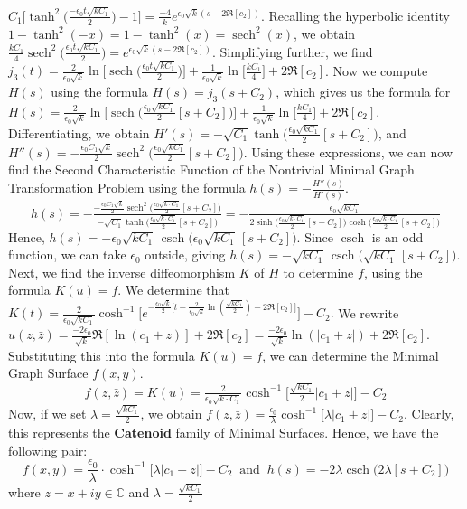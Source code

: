 \documentclass[12pt]{article}
\theoremstyle{plain}
\theoremstyle{definition}
\theoremstyle{remark}
\begin{document}
\(C_1 \big[\tanh^2\big(\tfrac{-\epsilon_0 t \sqrt{k C_1}}{2}\big) - 1\big] = \tfrac{-4}{k} e^{\epsilon_0 \sqrt{k} (s - 2\Re[c_2])}\). Recalling the hyperbolic identity \(1 - \tanh^2(-x) = 1 - \tanh^2(x) = \operatorname{sech}^2(x)\), we obtain  \(\tfrac{k C_1}{4} \operatorname{sech}^2\big(\tfrac{\epsilon_0 t \sqrt{k C_1}}{2}\big) = e^{\epsilon_0 \sqrt{k} (s - 2\Re[c_2])}\). Simplifying further, we find  \(j_3(t) = \tfrac{2}{\epsilon_0 \sqrt{k}} \ln\big[\operatorname{sech}\big(\tfrac{\epsilon_0 t \sqrt{k C_1}}{2}\big)\big] + \tfrac{1}{\epsilon_0 \sqrt{k}} \ln\big[\tfrac{k C_1}{4}\big] + 2\Re[c_2]\). Now we compute \(H(s)\) using the formula \(H(s) = j_3(s + C_2)\), which gives  us the formula for \(H(s) = \tfrac{2}{\epsilon_0 \sqrt{k}} \ln\big[\operatorname{sech}\big(\tfrac{\epsilon_0 \sqrt{k C_1}}{2} [s + C_2]\big)\big] + \tfrac{1}{\epsilon_0 \sqrt{k}} \ln\big[\tfrac{k C_1}{4}\big] + 2\Re[c_2]\). Differentiating, we obtain  \(H'(s) = -\sqrt{C_1} \tanh\big(\tfrac{\epsilon_0 \sqrt{k C_1}}{2} [s + C_2]\big)\), and  \(H''(s) = -\tfrac{\epsilon_0 C_1 \sqrt{k}}{2} \operatorname{sech}^2\big(\tfrac{\epsilon_0 \sqrt{k C_1}}{2} [s + C_2]\big)\). Using these expressions, we can now find the Second Characteristic Function of the Nontrivial Minimal Graph Transformation Problem using the formula \(h(s) = -\tfrac{H''(s)}{H'(s)}\).
\[
  h(s)=-\tfrac{-\tfrac{\epsilon_0C_1\sqrt{k}}{2} \operatorname{sech}^2\big(\tfrac{\epsilon_0\sqrt{k\cdot C_1}}{2}[s+C_2]\big)}{-\sqrt{C_1}\tanh\big(\tfrac{\epsilon_0\sqrt{k\cdot C_1}}{2}[s+C_2]\big)}=-\tfrac{\epsilon_0\sqrt{kC_1}}{2\sinh\big(\tfrac{\epsilon_0\sqrt{k\cdot C_1}}{2}[s+C_2]\big)\cosh\big(\tfrac{\epsilon_0\sqrt{k\cdot C_1}}{2}[s+C_2]\big)}
\]
Hence,  \(h(s) = -\epsilon_0 \sqrt{k C_1}\, \operatorname{csch}\big(\epsilon_0 \sqrt{k C_1}\,[s + C_2]\big)\).  
Since \(\operatorname{csch}\) is an odd function, we can take \(\epsilon_0\) outside, giving  
\(h(s) = -\sqrt{k C_1}\, \operatorname{csch}\big(\sqrt{k C_1}\,[s + C_2]\big)\). Next, we find the inverse diffeomorphism \(K\) of \(H\) to determine \(f\), using the formula \(K(u) = f\).  
We determine that \(K(t) = \tfrac{2}{\epsilon_0 \sqrt{k C_1}} \cosh^{-1}\!\Big[e^{-\tfrac{\epsilon_0 \sqrt{k}}{2} \big[t - \tfrac{2}{\epsilon_0 \sqrt{k}} \ln(\tfrac{\sqrt{k C_1}}{2}) - 2\Re[c_2]\big]}\Big] - C_2.\) We rewrite  
\(u(z, \bar{z}) = \tfrac{-2\epsilon_0}{\sqrt{k}} \Re[\ln(c_1 + z)] + 2\Re[c_2] = \tfrac{-2\epsilon_0}{\sqrt{k}} \ln(|c_1 + z|) + 2\Re[c_2].\) Substituting this into the formula \(K(u) = f\), we can determine the Minimal Graph Surface \(f(x, y)\).
\[
  f(z,\bar z)=K(u)=\tfrac{2}{\epsilon_0\sqrt{k\cdot C_1}}\cosh^{-1}\Big[\tfrac{\sqrt{kC_1}}{2}|c_1 +  z|\Big]-C_2
\] 
Now, if we set \(\lambda = \tfrac{\sqrt{k C_1}}{2}\), we obtain \(f(z, \bar{z}) = \tfrac{\epsilon_0}{\lambda} \cosh^{-1}\!\big[\lambda |c_1 + z|\big] - C_2.\) Clearly, this represents the \textbf{Catenoid} family of Minimal Surfaces. Hence, we have the following pair:
\begin{equation}
	\label{eqn: soln k>0, c_0=0}
	\boxed{f(x,y)=\frac{\epsilon_0}{\lambda}\cdot \cosh^{-1}\Big[\lambda|c_1 +  z|\Big]-C_2} \;\;\text{and}\;\;\boxed{h(s)=-2\lambda\operatorname{csch}\big(2\lambda[s+C_2]\big)}
\end{equation}
where \(z=x+iy\in\mathbb{C}\) and $\lambda=\tfrac{\sqrt{kC_1}}{2}$
\end{document}
